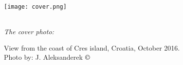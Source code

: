 \documentclass[12pt]{report}
\begin{document}
\begin{flushright}


\texttt{[image: cover.png]}

\setlength{\parskip}{0.1em}
\setlength{\parindent}{0cm}
\ \\[0.5cm]
\textit{The cover photo:}  

View from the coast of Cres island, Croatia, October 2016.
\ \\[0.1cm]
Photo by: J. Aleksanderek $\copyright$
\end{flushright}





\end{document}
